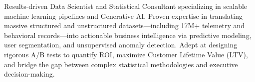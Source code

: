 
\begin{cvparagraph}
{
    Results-driven Data Scientist and Statistical Consultant specializing in 
    scalable machine learning pipelines and Generative AI. 
    Proven expertise in translating massive structured and unstructured datasets—including 17M+ telemetry 
    and behavioral records—into actionable business intelligence via predictive modeling, 
    user segmentation, and unsupervised anomaly detection. 
    Adept at designing rigorous A/B tests to quantify ROI, maximize Customer Lifetime Value (LTV), 
    and bridge the gap between complex statistical methodologies and executive decision-making.
}
\end{cvparagraph}
